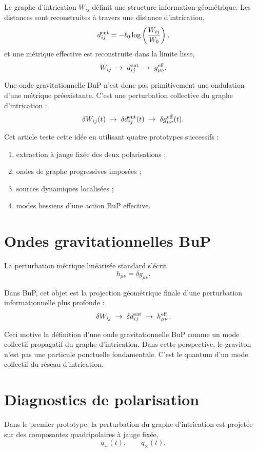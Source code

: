 \documentclass[11pt,a4paper]{article}
\begin{document}
Le graphe d'intrication \(W_{ij}\) définit une structure information-géométrique.
Les distances sont reconstruites à travers une distance d'intrication,
\[
d_{ij}^{\rm ent} = -\ell_0 \log\left(\frac{W_{ij}}{W_0}\right),
\]
et une métrique effective est reconstruite dans la limite lisse,
\[
W_{ij}
\;\rightarrow\;
d_{ij}^{\rm ent}
\;\rightarrow\;
g_{\mu\nu}^{\rm eff}.
\]

Une onde gravitationnelle BuP n'est donc pas primitivement une ondulation d'une
métrique préexistante. C'est une perturbation collective du graphe d'intrication :
\[
\delta W_{ij}(t)
\;\rightarrow\;
\delta d_{ij}^{\rm ent}(t)
\;\rightarrow\;
\delta g_{\mu\nu}^{\rm eff}(t).
\]

Cet article teste cette idée en utilisant quatre prototypes successifs :
\begin{enumerate}
    \item extraction à jauge fixée des deux polarisations ;
    \item ondes de graphe progressives imposées ;
    \item sources dynamiques localisées ;
    \item modes hessiens d'une action BuP effective.
\end{enumerate}

\section{Ondes gravitationnelles BuP}

La perturbation métrique linéarisée standard s'écrit
\[
h_{\mu\nu} = \delta g_{\mu\nu}.
\]

Dans BuP, cet objet est la projection géométrique finale d'une perturbation
informationnelle plus profonde :
\[
\delta W_{ij}
\;\rightarrow\;
\delta d_{ij}^{\rm ent}
\;\rightarrow\;
h_{\mu\nu}^{\rm eff}.
\]

Ceci motive la définition d'une onde gravitationnelle BuP comme un mode collectif
propagatif du graphe d'intrication. Dans cette perspective, le graviton n'est pas
une particule ponctuelle fondamentale. C'est le quantum d'un mode collectif du
réseau d'intrication.

\section{Diagnostics de polarisation}

Dans le premier prototype, la perturbation du graphe d'intrication est projetée
sur des composantes quadripolaires à jauge fixée,
\[
q_+(t), \qquad q_\times(t).
\]
\end{document}
